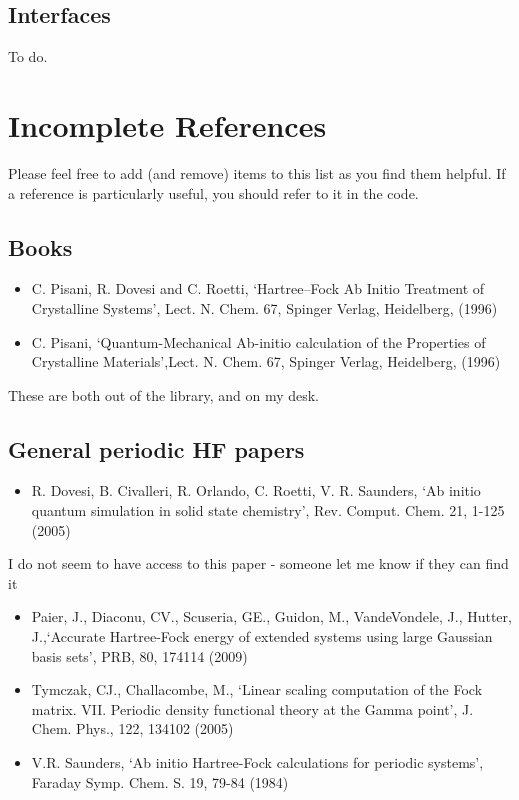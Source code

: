 \documentclass{report}
\begin{document}
\subsection{Interfaces}

To do.

\section{Incomplete References}

Please feel free to add (and remove) items to this list as you find them helpful. If a reference is particularly useful, you should refer to it in the code.

\subsection{Books}

\begin{itemize}
\item C. Pisani, R. Dovesi and C. Roetti, `Hartree--Fock Ab Initio Treatment of Crystalline Systems', Lect. N. Chem. 67, Spinger Verlag, Heidelberg, (1996)

\item C. Pisani, `Quantum-Mechanical Ab-initio calculation of the Properties of Crystalline Materials',Lect. N. Chem. 67, Spinger Verlag, Heidelberg, (1996)
\end{itemize}

These are both out of the library, and on my desk.

\subsection{General periodic HF papers}
\begin{itemize}
\item R. Dovesi, B. Civalleri, R. Orlando, C. Roetti, V. R. Saunders, `Ab initio quantum simulation in solid state chemistry', Rev. Comput. Chem. 21, 1-125 (2005)
\end{itemize}
I do not seem to have access to this paper - someone let me know if they can find it

\begin{itemize}
\item Paier, J., Diaconu, CV., Scuseria, GE., Guidon, M., VandeVondele, J., Hutter, J.,`Accurate Hartree-Fock energy of extended systems using large Gaussian basis sets', PRB, 80, 174114 (2009)

\item Tymczak, CJ., Challacombe, M., `Linear scaling computation of the Fock matrix. VII. Periodic density functional theory at the Gamma point', J. Chem. Phys., 122, 134102 (2005)

\item V.R. Saunders, `Ab initio Hartree-Fock calculations for periodic systems', Faraday Symp. Chem. S. 19, 79-84 (1984)
\end{itemize}
\end{document}
